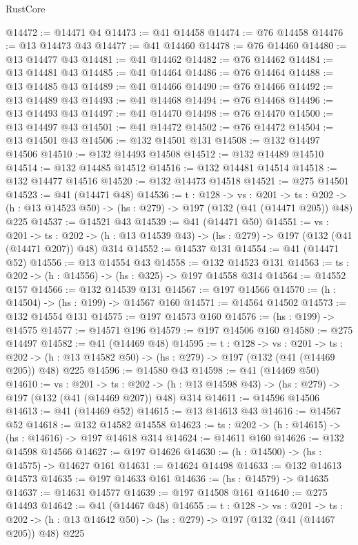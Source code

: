 \begin{lexlean}{RustCore}
\begin{coremodule}
@14472 := @14471 @4
@14473 := @41 @14458
@14474 := @76 @14458
@14476 := @13 @14473 @43
@14477 := @41 @14460
@14478 := @76 @14460
@14480 := @13 @14477 @43
@14481 := @41 @14462
@14482 := @76 @14462
@14484 := @13 @14481 @43
@14485 := @41 @14464
@14486 := @76 @14464
@14488 := @13 @14485 @43
@14489 := @41 @14466
@14490 := @76 @14466
@14492 := @13 @14489 @43
@14493 := @41 @14468
@14494 := @76 @14468
@14496 := @13 @14493 @43
@14497 := @41 @14470
@14498 := @76 @14470
@14500 := @13 @14497 @43
@14501 := @41 @14472
@14502 := @76 @14472
@14504 := @13 @14501 @43
@14506 := @132 @14501 @131
@14508 := @132 @14497 @14506
@14510 := @132 @14493 @14508
@14512 := @132 @14489 @14510
@14514 := @132 @14485 @14512
@14516 := @132 @14481 @14514
@14518 := @132 @14477 @14516
@14520 := @132 @14473 @14518
@14521 := @275 @14501
@14523 := @41 (@14471 @48)
@14536 := {t : @128} ->
  {vs : @201} ->
  {ts : @202} -> (h : @13 @14523 @50) -> (hs : @279) -> @197 (@132 (@41 (@14471 @205)) @48) @225
@14537 := @14521 @43
@14539 := @41 (@14471 @50)
@14551 := {vs : @201} ->
  {ts : @202} -> (h : @13 @14539 @43) -> (hs : @279) -> @197 (@132 (@41 (@14471 @207)) @48) @314
@14552 := @14537 @131
@14554 := @41 (@14471 @52)
@14556 := @13 @14554 @43
@14558 := @132 @14523 @131
@14563 := {ts : @202} -> (h : @14556) -> (hs : @325) -> @197 @14558 @314
@14564 := @14552 @157
@14566 := @132 @14539 @131
@14567 := @197 @14566
@14570 := (h : @14504) -> (hs : @199) -> @14567 @160
@14571 := @14564 @14502
@14573 := @132 @14554 @131
@14575 := @197 @14573 @160
@14576 := (hs : @199) -> @14575
@14577 := @14571 @196
@14579 := @197 @14506 @160
@14580 := @275 @14497
@14582 := @41 (@14469 @48)
@14595 := {t : @128} ->
  {vs : @201} ->
  {ts : @202} -> (h : @13 @14582 @50) -> (hs : @279) -> @197 (@132 (@41 (@14469 @205)) @48) @225
@14596 := @14580 @43
@14598 := @41 (@14469 @50)
@14610 := {vs : @201} ->
  {ts : @202} -> (h : @13 @14598 @43) -> (hs : @279) -> @197 (@132 (@41 (@14469 @207)) @48) @314
@14611 := @14596 @14506
@14613 := @41 (@14469 @52)
@14615 := @13 @14613 @43
@14616 := @14567 @52
@14618 := @132 @14582 @14558
@14623 := {ts : @202} -> (h : @14615) -> (hs : @14616) -> @197 @14618 @314
@14624 := @14611 @160
@14626 := @132 @14598 @14566
@14627 := @197 @14626
@14630 := (h : @14500) -> (hs : @14575) -> @14627 @161
@14631 := @14624 @14498
@14633 := @132 @14613 @14573
@14635 := @197 @14633 @161
@14636 := (hs : @14579) -> @14635
@14637 := @14631 @14577
@14639 := @197 @14508 @161
@14640 := @275 @14493
@14642 := @41 (@14467 @48)
@14655 := {t : @128} ->
  {vs : @201} ->
  {ts : @202} -> (h : @13 @14642 @50) -> (hs : @279) -> @197 (@132 (@41 (@14467 @205)) @48) @225

\end{coremodule}
\end{lexlean}
